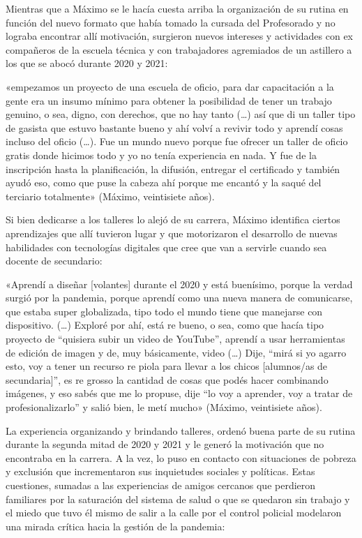 \begin{refsection}
Mientras que a Máximo se le hacía cuesta arriba la organización de su rutina en función del nuevo formato que había tomado la cursada del Profesorado y no lograba encontrar allí motivación, surgieron nuevos intereses y actividades con ex compañeros de la escuela técnica y con trabajadores agremiados de un astillero a los que se abocó durante 2020 y 2021:


\begin{gbcita}
«empezamos un proyecto de una escuela de oficio, para dar capacitación a la gente era un insumo mínimo para obtener la posibilidad de tener un trabajo genuino, o sea, digno, con derechos, que no hay tanto (…) así que di un taller tipo de gasista que estuvo bastante bueno y ahí volví a revivir todo y aprendí cosas incluso del oficio (…). Fue un mundo nuevo porque fue ofrecer un taller de oficio gratis donde hicimos todo y yo no tenía experiencia en nada. Y fue de la inscripción hasta la planificación, la difusión, entregar el certificado y también ayudó eso, como que puse la cabeza ahí porque me encantó y la saqué del terciario totalmente» (Máximo, veintisiete años).

\end{gbcita}

Si bien dedicarse a los talleres lo alejó de su carrera, Máximo identifica ciertos aprendizajes que allí tuvieron lugar y que motorizaron el desarrollo de nuevas habilidades con tecnologías digitales que cree que van a servirle cuando sea docente de secundario:


\begin{gbcita}
«Aprendí a diseñar [volantes] durante el 2020 y está buenísimo, porque la verdad surgió por la pandemia, porque aprendí como una nueva manera de comunicarse, que estaba super globalizada, tipo todo el mundo tiene que manejarse con dispositivo. (…) Exploré por ahí, está re bueno, o sea, como que hacía tipo proyecto de “quisiera subir un video de YouTube”, aprendí a usar herramientas de edición de imagen y de, muy básicamente, video (…) Dije, “mirá si yo agarro esto, voy a tener un recurso re piola para llevar a los chicos [alumnos/as de secundaria]”, es re grosso la cantidad de cosas que podés hacer combinando imágenes, y eso sabés que me lo propuse, dije “lo voy a aprender, voy a tratar de profesionalizarlo” y salió bien, le metí mucho» (Máximo, veintisiete años).

\end{gbcita}

La experiencia organizando y brindando talleres, ordenó buena parte de su rutina durante la segunda mitad de 2020 y 2021 y le generó la motivación que no encontraba en la carrera. A la vez, lo puso en contacto con situaciones de pobreza y exclusión que incrementaron sus inquietudes sociales y políticas. Estas cuestiones, sumadas a las experiencias de amigos cercanos que perdieron familiares por la saturación del sistema de salud o que se quedaron sin trabajo y el miedo que tuvo él mismo de salir a la calle por el control policial modelaron una mirada crítica hacia la gestión de la pandemia:



\end{refsection}
